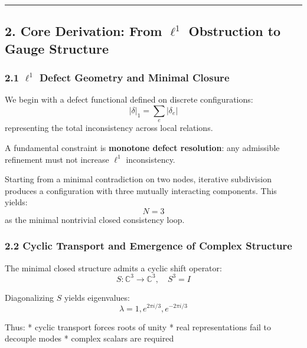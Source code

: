\documentclass[
]{article}
\begin{document}
\begin{center}\rule{0.5\linewidth}{0.5pt}\end{center}

\hypertarget{core-derivation-from-ell1-obstruction-to-gauge-structure}{%
\subsection{\texorpdfstring{2. Core Derivation: From \(\ell^1\)
Obstruction to Gauge
Structure}{2. Core Derivation: From \textbackslash ell\^{}1 Obstruction to Gauge Structure}}\label{core-derivation-from-ell1-obstruction-to-gauge-structure}}

\hypertarget{ell1-defect-geometry-and-minimal-closure}{%
\subsubsection{\texorpdfstring{2.1 \(\ell^1\) Defect Geometry and
Minimal
Closure}{2.1 \textbackslash ell\^{}1 Defect Geometry and Minimal Closure}}\label{ell1-defect-geometry-and-minimal-closure}}

We begin with a defect functional defined on discrete configurations:
\[|\delta|_1 = \sum_e |\delta_e|\] representing the total inconsistency
across local relations.

A fundamental constraint is \textbf{monotone defect resolution}: any
admissible refinement must not increase \(\ell^1\) inconsistency.

Starting from a minimal contradiction on two nodes, iterative
subdivision produces a configuration with three mutually interacting
components. This yields: \[N = 3\] as the minimal nontrivial closed
consistency loop.

\hypertarget{cyclic-transport-and-emergence-of-complex-structure}{%
\subsubsection{2.2 Cyclic Transport and Emergence of Complex
Structure}\label{cyclic-transport-and-emergence-of-complex-structure}}

The minimal closed structure admits a cyclic shift operator:
\[S : \mathbb{C}^3 \to \mathbb{C}^3, \quad S^3 = I\]

Diagonalizing \(S\) yields eigenvalues:
\[\lambda = 1, e^{2\pi i/3}, e^{-2\pi i/3}\]

Thus: * cyclic transport forces roots of unity * real representations
fail to decouple modes * complex scalars are required
\end{document}
